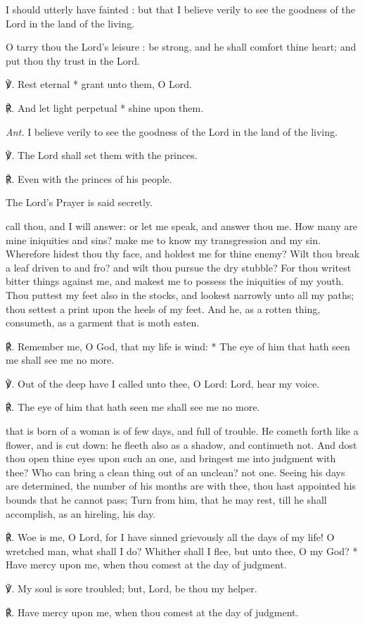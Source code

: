 I should utterly have fainted : but that I believe verily to see the goodness of the Lord in the land of the living.\par
{}O tarry thou the Lord's leisure : be strong, and he shall comfort thine heart; and put thou thy trust in the Lord.\par
℣. Rest eternal * grant unto them, O Lord.\par
℟. And let light perpetual * shine upon them.\par\noindent
\textit{Ant.} I believe verily to see the goodness of the Lord in the land of the living.\par
\vspace{0.5\baselineskip}
℣. The Lord shall set them with the princes.\par
℟. Even with the princes of his people.\par
\begin{rubric}
    {The Lord's Prayer is said secretly.}
\end{rubric}
 call thou, and I will answer: or let me speak, and answer thou me. How many are mine iniquities and sins? make me to know my transgression and my sin. Wherefore hidest thou thy face, and holdest me for thine enemy? Wilt thou break a leaf driven to and fro? and wilt thou pursue the dry stubble? For thou writest bitter things against me, and makest me to possess the iniquities of my youth. Thou puttest my feet also in the stocks, and lookest narrowly unto all my paths; thou settest a print upon the heels of my feet. And he, as a rotten thing, consumeth, as a garment that is moth eaten.\par
℟. Remember me, {\dag} O God, that my life is wind: * The eye of him that hath seen me shall see me no more.\par
℣. Out of the deep have I called unto thee, O Lord: Lord, hear my voice.\par
℟. The eye of him that hath seen me shall see me no more.

 that is born of a woman is of few days, and full of trouble. He cometh forth like a flower, and is cut down: he fleeth also as a shadow, and continueth not. And dost thou open thine eyes upon such an one, and bringest me into judgment with thee? Who can bring a clean thing out of an unclean? not one. Seeing his days are determined, the number of his months are with thee, thou hast appointed his bounds that he cannot pass; Turn from him, that he may rest, till he shall accomplish, as an hireling, his day.\par
℟. Woe is me, {\dag} O Lord, for I have sinned grievously all the days of my life! O wretched man, what shall I do? Whither shall I flee, but unto thee, O my God? * Have mercy upon me, when thou comest at the day of judgment.\par
℣. My soul is sore troubled; but, Lord, be thou my helper.\par
℟. Have mercy upon me, when thou comest at the day of judgment.

